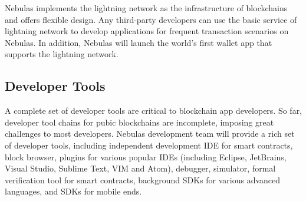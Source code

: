 Nebulas implements the lightning network as the infrastructure of blockchains and offers flexible design. Any third-party developers can use the basic service of lightning network to develop applications for frequent transaction scenarios on Nebulas. In addition, Nebulas will launch the world's first wallet app that supports the lightning network.

\subsection{Developer Tools}

A complete set of developer tools are critical to blockchain app developers. So far, developer tool chains for pubic blockchains are incomplete, imposing great challenges to most developers. Nebulas development team will provide a rich set of developer tools, including independent development IDE for smart contracts, block browser, plugins for various popular IDEs (including Eclipse, JetBrains, Visual Studio, Sublime Text, VIM and Atom), debugger, simulator, formal verification tool for smart contracts, background SDKs for various advanced languages, and SDKs for mobile ends.